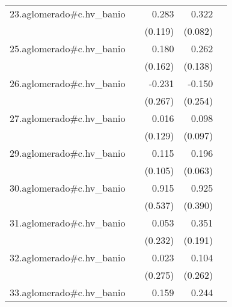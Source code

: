 {\begin{longtable}{l*{4}{D{.}{.}{-1}}}
\addlinespace
23.aglomerado#c.hv\_banio&                     &       0.283\sym{*}  &       0.322\sym{***}&                     \\
            &                     &     (0.119)         &     (0.082)         &                     \\
\addlinespace
25.aglomerado#c.hv\_banio&                     &       0.180         &       0.262         &                     \\
            &                     &     (0.162)         &     (0.138)         &                     \\
\addlinespace
26.aglomerado#c.hv\_banio&                     &      -0.231         &      -0.150         &                     \\
            &                     &     (0.267)         &     (0.254)         &                     \\
\addlinespace
27.aglomerado#c.hv\_banio&                     &       0.016         &       0.098         &                     \\
            &                     &     (0.129)         &     (0.097)         &                     \\
\addlinespace
29.aglomerado#c.hv\_banio&                     &       0.115         &       0.196\sym{**} &                     \\
            &                     &     (0.105)         &     (0.063)         &                     \\
\addlinespace
30.aglomerado#c.hv\_banio&                     &       0.915         &       0.925\sym{*}  &                     \\
            &                     &     (0.537)         &     (0.390)         &                     \\
\addlinespace
31.aglomerado#c.hv\_banio&                     &       0.053         &       0.351         &                     \\
            &                     &     (0.232)         &     (0.191)         &                     \\
\addlinespace
32.aglomerado#c.hv\_banio&                     &       0.023         &       0.104         &                     \\
            &                     &     (0.275)         &     (0.262)         &                     \\
\addlinespace
33.aglomerado#c.hv\_banio&                     &       0.159         &       0.244\sym{***}&                     \\

\end{longtable}}
